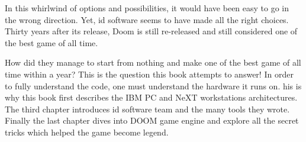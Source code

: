  \par
 In this whirlwind of options and possibilities, it would have been easy to go in the wrong direction. Yet, id software seems to have made all the right choices. Thirty years after its release, Doom is still re-released and still considered one of the best game of all time.\\
\par
 How did they manage to start from nothing and make one of the best game of all time within a year? This is the question this book attempts to answer! In order to fully understand the code, one must understand the hardware it runs on. his is why this book first describes the IBM PC and NeXT workstations architectures. The third chapter introduces id software team and the many tools they wrote. Finally the last chapter dives into DOOM game engine and explore all the secret tricks which helped the game become legend.
